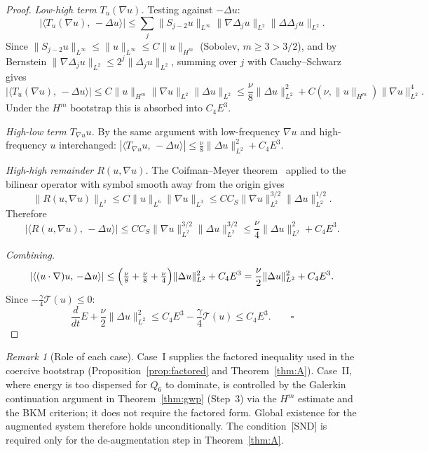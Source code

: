 \documentclass[12pt]{amsart}
\theoremstyle{remark}
\newtheorem{remark}[theorem]{Remark}
\newcommand{\Tcal}{\mathcal{T}}
\newcommand{\Qsix}{Q_6}
\newcommand{\ip}[2]{\langle #1,\, #2 \rangle}
\begin{document}
\begin{proof}
\smallskip\noindent\textit{Low-high term $T_u(\nabla u)$.}
Testing against $-\Delta u$:
\[
  |\ip{T_u(\nabla u)}{-\Delta u}|
  \le\sum_j\|S_{j-2}u\|_{L^\infty}
     \|\nabla\Delta_j u\|_{L^2}\|\Delta\Delta_j u\|_{L^2}.
\]
Since $\|S_{j-2}u\|_{L^\infty}\le\|u\|_{L^\infty}\le C\|u\|_{H^m}$
(Sobolev, $m\ge 3>3/2$), and by Bernstein
$\|\nabla\Delta_j u\|_{L^2}\le 2^j\|\Delta_j u\|_{L^2}$,
summing over $j$ with Cauchy--Schwarz gives
\[
  |\ip{T_u(\nabla u)}{-\Delta u}|
  \le C\|u\|_{H^m}\|\nabla u\|_{L^2}\|\Delta u\|_{L^2}
  \le\frac{\nu}{8}\|\Delta u\|_{L^2}^2 + C(\nu,\|u\|_{H^m})\|\nabla u\|_{L^2}^4.
\]
Under the $H^m$ bootstrap this is absorbed into $C_4E^3$.

\smallskip\noindent\textit{High-low term $T_{\nabla u}u$.}
By the same argument with low-frequency $\nabla u$ and high-frequency
$u$ interchanged:
$|\ip{T_{\nabla u}u}{-\Delta u}|\le\tfrac{\nu}{8}\|\Delta u\|_{L^2}^2+C_4E^3$.

\smallskip\noindent\textit{High-high remainder $R(u,\nabla u)$.}
The Coifman--Meyer theorem~\cite{CM78} applied to the bilinear operator
with symbol smooth away from the origin gives
\[
  \|R(u,\nabla u)\|_{L^2}\le C\|u\|_{L^6}\|\nabla u\|_{L^3}
  \le CC_S\|\nabla u\|_{L^2}^{3/2}\|\Delta u\|_{L^2}^{1/2}.
\]
Therefore
\[
  |\ip{R(u,\nabla u)}{-\Delta u}|
  \le CC_S\|\nabla u\|_{L^2}^{3/2}\|\Delta u\|_{L^2}^{3/2}
  \le\frac{\nu}{4}\|\Delta u\|_{L^2}^2+C_4E^3.
\]

\smallskip\noindent\textit{Combining.}
\[
  |\ip{(u\cdot\nabla)u}{-\Delta u}|
  \le\Bigl(\tfrac{\nu}{8}+\tfrac{\nu}{8}+\tfrac{\nu}{4}\Bigr)
     \|\Delta u\|_{L^2}^2+C_4E^3
  =\frac{\nu}{2}\|\Delta u\|_{L^2}^2+C_4E^3.
\]
Since $-\tfrac{\gamma}{4}\Tcal(u)\le 0$:
\[
  \frac{d}{dt}E+\frac{\nu}{2}\|\Delta u\|_{L^2}^2
  \le C_4E^3-\frac{\gamma}{4}\Tcal(u)\le C_4E^3.
  \qquad\square
\]
\end{proof}

\begin{remark}[Role of each case]
Case~I supplies the factored inequality used in the coercive bootstrap
(Proposition~\ref{prop:factored} and Theorem~\ref{thm:A}).
Case~II, where energy is too dispersed for $\Qsix$ to dominate, is
controlled by the Galerkin continuation argument in
Theorem~\ref{thm:gwp} (Step~3) via the $H^m$ estimate and the BKM
criterion; it does not require the factored form.
Global existence for the augmented system therefore holds
unconditionally.  The condition~[SND] is required only for the
de-augmentation step in Theorem~\ref{thm:A}.
\end{remark}
\end{document}
